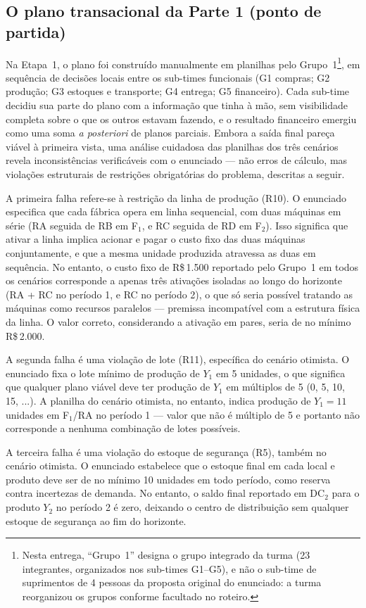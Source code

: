 \documentclass[11pt,a4paper]{article}
\newcommand{\rs}{R\$\,}
\begin{document}
\subsection{O plano transacional da Parte 1 (ponto de partida)}
Na Etapa~1, o plano foi construído manualmente em planilhas pelo Grupo~1\footnote{Nesta entrega, ``Grupo~1'' designa o grupo integrado da turma (23 integrantes, organizados nos sub-times G1--G5), e não o sub-time de suprimentos de 4 pessoas da proposta original do enunciado: a turma reorganizou os grupos conforme facultado no roteiro.}, em sequência de decisões locais entre os sub-times funcionais (G1 compras; G2 produção; G3 estoques e transporte; G4 entrega; G5 financeiro). Cada sub-time decidiu sua parte do plano com a informação que tinha à mão, sem visibilidade completa sobre o que os outros estavam fazendo, e o resultado financeiro emergiu como uma soma \emph{a posteriori} de planos parciais. Embora a saída final pareça viável à primeira vista, uma análise cuidadosa das planilhas dos três cenários revela inconsistências verificáveis com o enunciado --- não erros de cálculo, mas violações estruturais de restrições obrigatórias do problema, descritas a seguir.

A primeira falha refere-se à restrição da linha de produção (R10). O enunciado especifica que cada fábrica opera em linha sequencial, com duas máquinas em série (RA seguida de RB em F$_1$, e RC seguida de RD em F$_2$). Isso significa que ativar a linha implica acionar e pagar o custo fixo das duas máquinas conjuntamente, e que a mesma unidade produzida atravessa as duas em sequência. No entanto, o custo fixo de \rs1.500 reportado pelo Grupo~1 em todos os cenários corresponde a apenas três ativações isoladas ao longo do horizonte (RA + RC no período 1, e RC no período 2), o que só seria possível tratando as máquinas como recursos paralelos --- premissa incompatível com a estrutura física da linha. O valor correto, considerando a ativação em pares, seria de no mínimo \rs2.000.

A segunda falha é uma violação de lote (R11), específica do cenário otimista. O enunciado fixa o lote mínimo de produção de $Y_1$ em 5 unidades, o que significa que qualquer plano viável deve ter produção de $Y_1$ em múltiplos de 5 (0, 5, 10, 15, ...). A planilha do cenário otimista, no entanto, indica produção de $Y_1 = 11$ unidades em F$_1$/RA no período 1 --- valor que não é múltiplo de 5 e portanto não corresponde a nenhuma combinação de lotes possíveis.

A terceira falha é uma violação do estoque de segurança (R5), também no cenário otimista. O enunciado estabelece que o estoque final em cada local e produto deve ser de no mínimo 10 unidades em todo período, como reserva contra incertezas de demanda. No entanto, o saldo final reportado em DC$_2$ para o produto $Y_2$ no período 2 é zero, deixando o centro de distribuição sem qualquer estoque de segurança ao fim do horizonte.
\end{document}
